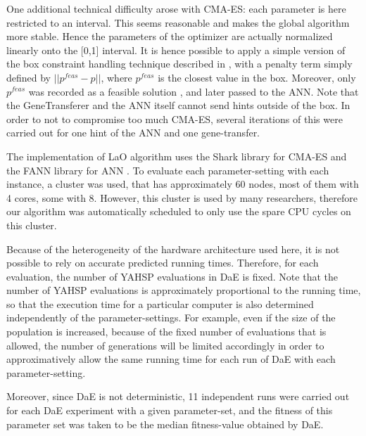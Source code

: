 \documentclass{MYsig-alternate}
\begin{document}
One additional technical difficulty arose with CMA-ES: each parameter is here restricted to an interval. This seems reasonable and makes the global algorithm more stable. Hence the parameters of the optimizer are actually normalized linearly onto the [0,1] interval. It is hence possible to apply a simple version of the box constraint handling technique described in \cite{hansen2009tec}, with a penalty term simply defined by \begin{math}||p^{feas}-p|| \end{math}, where \begin{math}p^{feas}\end{math} is the closest value in the box. Moreover, only \begin{math}p^{feas}\end{math} was recorded as a feasible solution , and later passed to the ANN. Note that the GeneTransferer and the ANN itself cannot send hints outside of the box. In order to not to compromise too much CMA-ES, several iterations of this were carried out for one hint of the ANN and one gene-transfer.

The implementation of LaO algorithm uses the Shark library \cite{shark08} for CMA-ES and the FANN library for ANN \cite{nissen}. To evaluate each parameter-setting with each instance,  a cluster was used, that has approximately 60 nodes, most of them with 4 cores, some with 8. However, this cluster is used by many researchers, therefore our algorithm was automatically scheduled to only use the spare CPU cycles on this cluster.

Because of the heterogeneity of the hardware architecture used here, it is not possible to rely on accurate predicted running times. Therefore, for each evaluation, the number of YAHSP evaluations in DaE is fixed. Note that the number of YAHSP evaluations is approximately proportional to the running time, so that the execution time for a particular computer is also determined independently of the parameter-settings. For example, even if the size of the population is increased, because of the fixed number of evaluations that is allowed, the number of generations will be limited accordingly in order to approximatively allow the same running time for each run of DaE with each parameter-setting. 


Moreover, since DaE is not deterministic, 11 independent runs were carried out for each DaE experiment with a given parameter-set, and the fitness of this parameter set was taken to be the median fitness-value obtained by DaE.
\end{document}
